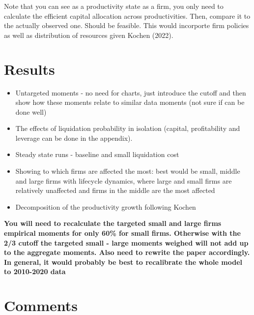 \documentclass[12pt]{article}
\begin{document}
\noindent Note that you can see as a productivity state as a firm, you only need to calculate the efficient capital allocation across productivities. Then, compare it to the actually observed one. Should be feasible. This would incorporte firm policies as well as distribution of resources given Kochen (2022). 

\section*{Results}

\begin{itemize} \setlength\itemsep{0em}  \small
    \item Untargeted moments - no need for charts, just introduce the cutoff and then show how these moments relate to similar data moments (not sure if can be done well)
    \item The effects of liquidation probability in isolation (capital, profitability and leverage can be done in the appendix). 
    \item Steady state runs - baseline and small liquidation cost 
    \item Showing to which firms are affected the most: best would be small, middle and large firms with lifecycle dynamics, where large and small firms are relatively unaffected and firms in the middle are the most affected
    \item Decomposition of the productivity growth following Kochen
\end{itemize} \normalsize

\textbf{You will need to recalculate the targeted small and large firms empirical moments for only 60\% for small firms. Otherwise with the 2/3 cutoff the targeted small - large moments weighed will not add up to the aggregate moments. Also need to rewrite the paper accordingly. In general, it would probably be best to recalibrate the whole model to 2010-2020 data}


\newpage
\section*{Comments}
\end{document}
